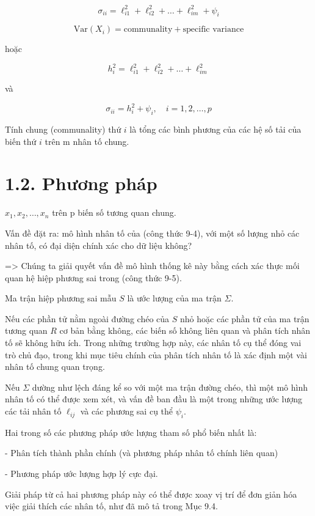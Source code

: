 \documentclass{article}
\begin{document}
\[
\sigma_{ii} = \ell_{i1}^2 + \ell_{i2}^2 + \ldots + \ell_{im}^2 + \psi_i
\]

\[
\text{Var}(X_i) = \text{communality} + \text{specific variance}
\]

hoặc

\[
h_i^2 = \ell_{i1}^2 + \ell_{i2}^2 + \ldots + \ell_{im}^2
\]

và

\[
\sigma_{ii} = h_i^2 + \psi_i, \quad i = 1, 2, \ldots, p
\]

Tính chung (communality) thứ \(i\) là tổng các bình phương của các hệ số tải của biến thứ \(i\) trên m nhân tố chung.

\vspace{1cm}
\section*{1.2. Phương pháp}
\vspace{0cm}


 \( x_1, x_2, \ldots, x_n \) trên p biến số tương quan chung.
 
 Vấn đề đặt ra: mô hình nhân tố của (công thức 9-4), với một số lượng nhỏ các nhân tố, có đại diện chính xác cho dữ liệu không?
 
 => Chúng ta giải quyết vấn đề mô hình thống kê này bằng cách xác thực mối quan hệ hiệp phương sai trong (công thức 9-5).

Ma trận hiệp phương sai mẫu \( S \) là ước lượng của ma trận \(\Sigma \).

Nếu các phần tử nằm ngoài đường chéo của \( S \) nhỏ hoặc các phần tử của ma trận tương quan \( R \) cơ bản bằng không, các biến số không liên quan và phân tích nhân tố sẽ không hữu ích. Trong những trường hợp này, các nhân tố cụ thể đóng vai trò chủ đạo, trong khi mục tiêu chính của phân tích nhân tố là xác định một vài nhân tố chung quan trọng.

Nếu \( \Sigma \) dường như lệch đáng kể so với một ma trận đường chéo, thì một mô hình nhân tố có thể được xem xét, và vấn đề ban đầu là một trong những ước lượng các tải nhân tố \( \ell_{ij} \) và các phương sai cụ thể \( \psi_i \).

Hai trong số các phương pháp ước lượng tham số phổ biến nhất là:

- Phân tích thành phần chính (và phương pháp nhân tố chính liên quan)

- Phương pháp ước lượng hợp lý cực đại.

Giải pháp từ cả hai phương pháp này có thể được xoay vị trí để đơn giản hóa việc giải thích các nhân tố, như đã mô tả trong Mục 9.4.
\end{document}
